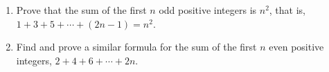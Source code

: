 \begin{enumerate}
\item[(a)] Prove that the sum of the first $n$ odd positive integers is $n^2$, that is, $1+3+5+\cdots+(2n-1)=n^2$.
\item[(b)] Find and prove a similar formula for the sum of the first $n$ even positive integers, $2+4+6+\cdots+2n$.
\end{enumerate}
